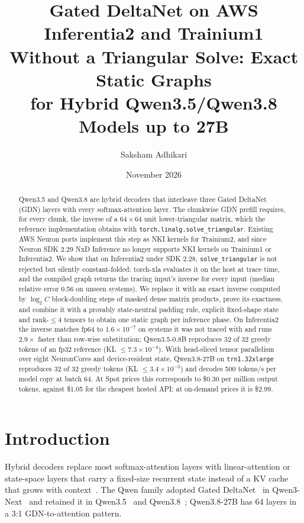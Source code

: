 \documentclass[11pt]{article}
\title{Gated DeltaNet on AWS Inferentia2 and Trainium1\\ Without a Triangular Solve:
Exact Static Graphs\\ for Hybrid Qwen3.5/Qwen3.8 Models up to 27B}
\author{Saksham Adhikari}
\date{November 2026}
\theoremstyle{remark}
\begin{document}
\maketitle

\begin{abstract}
Qwen3.5 and Qwen3.8 are hybrid decoders that interleave three Gated DeltaNet (GDN) layers with every softmax-attention layer.
The chunkwise GDN prefill requires, for every chunk, the inverse of a $64\times64$ unit lower-triangular matrix, which the
reference implementation obtains with \texttt{torch.linalg.solve\_triangular}. Existing AWS Neuron ports implement this step
as NKI kernels for Trainium2, and since Neuron SDK 2.29 NxD Inference no longer supports NKI kernels on Trainium1 or
Inferentia2. We show that on Inferentia2 under SDK 2.28, \texttt{solve\_triangular} is not rejected but silently
constant-folded: torch-xla evaluates it on the host at trace time, and the compiled graph returns the tracing input's inverse
for every input (median relative error 0.56 on unseen systems). We replace it with an exact inverse computed by $\log_2 C$
block-doubling steps of masked dense matrix products, prove its exactness, and combine it with a provably state-neutral
padding rule, explicit fixed-shape state and rank-$\le4$ tensors to obtain one static graph per inference phase. On
Inferentia2 the inverse matches fp64 to $1.6\times10^{-7}$ on systems it was not traced with and runs $2.9\times$ faster than
row-wise substitution; Qwen3.5-0.8B reproduces 32 of 32 greedy tokens of an fp32 reference (KL $\le7.3\times10^{-4}$). With
head-sliced tensor parallelism over eight NeuronCores and device-resident state, Qwen3.8-27B on \texttt{trn1.32xlarge}
reproduces 32 of 32 greedy tokens (KL $\le3.4\times10^{-3}$) and decodes 500 tokens/s per model copy at batch 64. At Spot
prices this corresponds to \$0.30 per million output tokens, against \$1.05 for the cheapest hosted API; at on-demand prices
it is \$2.99.
\end{abstract}

\section{Introduction}
Hybrid decoders replace most softmax-attention layers with linear-attention or state-space layers that carry a fixed-size
recurrent state instead of a KV cache that grows with context~\cite{lieber2024jamba,minimax2025,nemotronh2025,kimi2025linear}.
The Qwen family adopted Gated DeltaNet~\cite{yang2025gdn} in Qwen3-Next~\cite{qwen3next} and retained it in
Qwen3.5~\cite{qwen35} and Qwen3.8~\cite{qwen38card,qiu2026qwen38next}; Qwen3.8-27B has 64 layers in a 3:1 GDN-to-attention
pattern.
\end{document}
